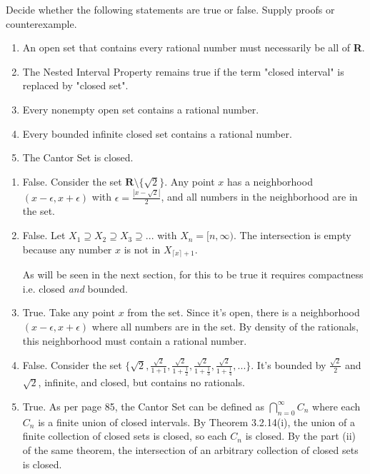 \documentclass{oxmathproblems}
\begin{document}
\begin{questions}
\miquestion Decide whether the following statements are true or false. Supply proofs or counterexample.
\begin{enumerate}[label=(\alph*)]
  \item An open set that contains every rational number must necessarily be all of \textbf{R}.
  \item The Nested Interval Property remains true if the term "closed interval" is replaced by "closed set".
  \item Every nonempty open set contains a rational number.
  \item Every bounded infinite closed set contains a rational number.
  \item The Cantor Set is closed.
\end{enumerate}

\begin{solution}
  \begin{enumerate}[label=(\alph*)]
    \item False. Consider the set $\textbf{R} \setminus \{\sqrt{2}\}$. Any point $x$ has a neighborhood $(x-\epsilon, x+\epsilon)$ with $\epsilon = \frac{|x-\sqrt{2}|}{2}$, and
    all numbers in the neighborhood are in the set.

    \item False. Let $X_{1} \supseteq X_{2} \supseteq X_{3} \supseteq ...$ with $X_{n} = [n, \infty)$. The intersection is empty because
    any number $x$ is not in $X_{\lceil x \rceil + 1}$.

    As will be seen in the next section, for this to be true it requires compactness i.e. closed \textit{and} bounded.
    
    \item True. Take any point $x$ from the set. Since it's open, there is a neighborhood $(x-\epsilon, x+\epsilon)$ where all numbers are in the set. By density of the rationals,
    this neighborhood must contain a rational number.

    \item False. Consider the set $\{\sqrt{2}, \frac{\sqrt{2}}{1+1}, \frac{\sqrt{2}}{1+\frac{1}{2}}, \frac{\sqrt{2}}{1+\frac{1}{3}}, \frac{\sqrt{2}}{1+\frac{1}{4}}, ...\}$.
    It's bounded by $\frac{\sqrt{2}}{2}$ and $\sqrt{2}$, infinite, and closed, but contains no rationals.

    \item True. As per page 85, the Cantor Set can be defined as $\bigcap_{n=0}^{\infty} C_{n}$ where each $C_{n}$ is a finite union of closed intervals. By Theorem 3.2.14(i),
    the union of a finite collection of closed sets is closed, so each $C_{n}$ is closed. By the part (ii) of the same theorem, the intersection of an arbitrary collection of
    closed sets is closed.
  \end{enumerate}
\end{solution}


\end{questions}
\end{document}
